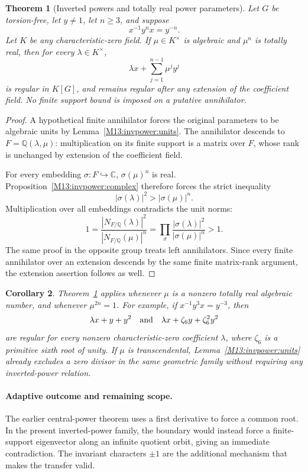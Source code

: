\documentclass[11pt,a4paper,oneside]{report}
\newtheorem{theorem}{Theorem}[section]
\newtheorem{corollary}[theorem]{Corollary}
\theoremstyle{definition}
\theoremstyle{remark}
\newcommand{\C}{\mathbb C}
\newcommand{\Q}{\mathbb Q}
\begin{document}
\begin{theorem}[Inverted powers and totally real power parameters]
\label{M13:invpower:main}
Let $G$ be torsion-free, let $y\ne1$, let $n\ge3$, and suppose
\[
 x^{-1}y^n x=y^{-n}.
\]
Let $K$ be any characteristic-zero field. If $\mu\in K^\times$
is algebraic and $\mu^n$ is totally real, then for every
$\lambda\in K^\times$,
\begin{equation}\label{M13:invpower:family}
 \lambda x+\sum_{j=1}^{n-1}\mu^j y^j
\end{equation}
is regular in $K[G]$, and remains regular after any extension
of the coefficient field. No finite support bound is imposed on
a putative annihilator.
\end{theorem}
\begin{proof}
A hypothetical finite annihilator forces the original parameters
to be algebraic units by Lemma~\ref{M13:invpower:units}.
The annihilator descends to $F=\Q(\lambda,\mu)$: multiplication
on its finite support is a matrix over $F$, whose rank is unchanged
by extension of the coefficient field.

For every embedding $\sigma:F\hookrightarrow\C$,
$\sigma(\mu)^n$ is real. Proposition~\ref{M13:invpower:complex}
therefore forces the strict inequality
\[
 |\sigma(\lambda)|^2>|\sigma(\mu)|^n.
\]
Multiplication over all embeddings contradicts the unit norms:
\[
 1=\frac{|N_{F/\Q}(\lambda)|^2}
          {|N_{F/\Q}(\mu)|^n}
   =\prod_\sigma
      \frac{|\sigma(\lambda)|^2}{|\sigma(\mu)|^n}>1.
\]
The same proof in the opposite group treats left annihilators.
Since every finite annihilator over an extension descends by
the same finite matrix-rank argument, the extension assertion
follows as well.
\end{proof}

\begin{corollary}\label{M13:invpower:examples}
Theorem~\ref{M13:invpower:main} applies whenever $\mu$ is a nonzero
totally real algebraic number, and whenever $\mu^{2n}=1$.
For example, if $x^{-1}y^3x=y^{-3}$, then
\[
 \lambda x+y+y^2
 \quad\hbox{and}\quad
 \lambda x+\zeta_6y+\zeta_6^2y^2
\]
are regular for every nonzero characteristic-zero coefficient
$\lambda$, where $\zeta_6$ is a primitive sixth root of unity.
If $\mu$ is transcendental, Lemma~\ref{M13:invpower:units} already
excludes a zero divisor in the same geometric family without
requiring any inverted-power relation.
\end{corollary}

\paragraph{Adaptive outcome and remaining scope.}
The earlier central-power theorem uses a first derivative to force
a common root. In the present inverted-power family, the boundary
would instead force a finite-support eigenvector along an infinite
quotient orbit, giving an immediate contradiction. The invariant
characters $\pm1$ are the additional mechanism that makes the
transfer valid.
\end{document}

